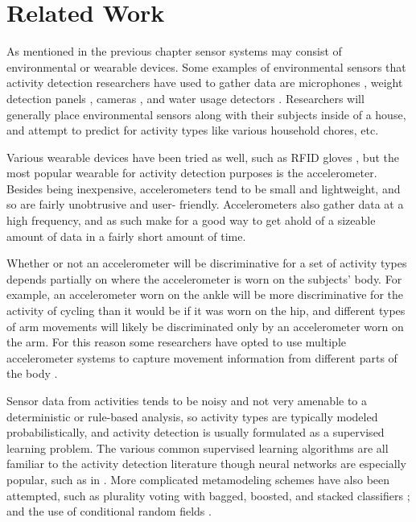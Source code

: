 \chapter{Related Work}
As mentioned in the previous chapter sensor systems may consist
of environmental or wearable devices. Some examples of environmental
sensors that activity detection researchers have used to
gather data are microphones \cite{fogarty06}, weight detection
panels \cite{rowan05}, cameras \cite{duong05}, and water usage detectors
\cite{fogarty06}. Researchers will generally place environmental sensors
along with their subjects inside of a house, and attempt to predict
for activity types like various household chores, etc.

Various wearable devices have been tried as well, such as RFID gloves
\cite{rowan05}, but the most popular wearable for activity detection
purposes is the accelerometer. Besides being inexpensive, accelerometers
tend to be small and lightweight, and so are fairly unobtrusive and user-
friendly. Accelerometers also gather data at a high frequency, and as such make
for a good way to get ahold of a sizeable amount of data in a fairly short
amount of time.

Whether or not an accelerometer will be discriminative for a
set of activity types depends partially on where the accelerometer is worn on
the subjects' body. For example, an accelerometer worn on the ankle will be
more discriminative for the activity of cycling than it would be if it was worn
on the hip, and different types of arm movements will likely be
discriminated only by an accelerometer worn on the arm. For this reason some
researchers have opted to use multiple accelerometer systems to capture
movement information from different parts of the body \cite{bao04}
\cite{devries11}.

Sensor data from activities tends to be noisy and not very amenable to a
deterministic or rule-based analysis, so activity types are typically modeled
probabilistically, and activity detection is usually formulated as a supervised
learning problem. The various common supervised learning algorithms are all
familiar to the activity detection literature though neural networks are
especially popular, such as in \cite{aminian95} \cite{song07} \cite{staudenmeyer09}.
More complicated metamodeling schemes have also been attempted, such as plurality voting with bagged,
boosted, and stacked classifiers \cite{ravi05}; and the use of conditional
random fields \cite{vankasteren08}.
